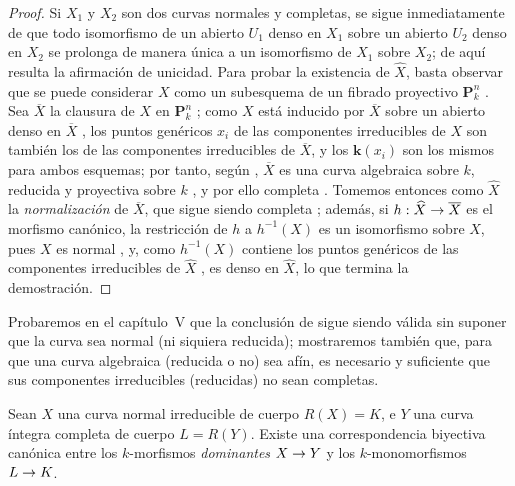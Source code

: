 \documentclass[oneside,10pt]{amsart}
\makeatletter
\newcommand{\ega@arrow}[2]{\mathchoice{#1}{#2}{#2}{#2}}
\renewcommand{\to}{\ega@arrow{\longrightarrow}{\rightarrow}}
\newcommand{\oldpage}[2][]{\marginnote{\normalfont\footnotesize\textbf{#1}~|~#2}\ignorespaces}
\let\EGAOriginalLabel\label
\renewcommand{\label}[1]{\phantomsection\EGAOriginalLabel{#1}}
\makeatother
\begin{document}
\begin{proof}
Si $X_1$ y $X_2$ son dos curvas normales y completas, se sigue inmediatamente de  que todo isomorfismo de un abierto $U_1$ denso en $X_1$ sobre un abierto $U_2$ denso en $X_2$ se prolonga de manera única a un isomorfismo de $X_1$ sobre $X_2$;
de aquí resulta la afirmación de unicidad.
Para probar la existencia de $\widehat{X}$, basta observar que se puede considerar $X$ como un subesquema de un fibrado proyectivo $\mathbf{P}_k^n$ .
Sea $\overline{X}$ la clausura de $X$ en $\mathbf{P}_k^n$ ;
como $X$ está inducido por $\overline{X}$ sobre un abierto denso en $\overline{X}$ , los puntos genéricos $x_i$ de las componentes irreducibles de $X$ son también los de las componentes irreducibles de $\overline{X}$, y los $\boldsymbol{k}(x_i)$ son los mismos para ambos esquemas; por tanto, según , $\overline{X}$ es una curva algebraica sobre $k$, reducida  y proyectiva sobre $k$ , y por ello completa .
Tomemos entonces como $\widehat{X}$ la \emph{normalización} de $\overline{X}$, que sigue siendo completa ;
además, si $h:\widehat{X}\to\overline{X}$ es el morfismo canónico, la restricción de $h$ a $h^{-1}(X)$ es un isomorfismo sobre $X$, pues $X$ es normal , y, como $h^{-1}(X)$ contiene los puntos genéricos de las componentes irreducibles de $\widehat{X}$ , es denso en $\widehat{X}$, lo que termina la demostración.
\end{proof}

\oldpage[II]{151}
\begin{remark}[7.4.12]
\label{II.7.4.12-fr}
Probaremos en el capítulo~V que la conclusión de  sigue siendo válida sin suponer que la curva sea normal (ni siquiera reducida);
mostraremos también que, para que una curva algebraica (reducida o no) sea afín, es necesario y suficiente que sus componentes irreducibles (reducidas) no sean completas.
\end{remark}

\begin{corollary}[7.4.13]
\label{II.7.4.13-fr}
Sean $X$ una curva \textup{normal} irreducible de cuerpo $R(X)=K$, e $Y$ una curva íntegra \textup{completa} de cuerpo $L=R(Y)$.
Existe una correspondencia biyectiva canónica entre los $k$-morfismos \emph{dominantes} $X\to Y$ y los $k$-monomorfismos $L\to K$.
\end{corollary}
\end{document}
